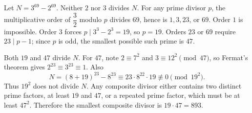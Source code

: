 Let $N=3^{69}-2^{69}$. Neither $2$ nor $3$ divides $N$. For any prime divisor $p$, the multiplicative order of $\dfrac{3}{2}$ modulo $p$ divides $69$, hence is $1,3,23$, or $69$. Order $1$ is impossible. Order $3$ forces $p\mid3^3-2^3=19$, so $p=19$. Orders $23$ or $69$ require $23\mid p-1$; since $p$ is odd, the smallest possible such prime is $47$.

Both $19$ and $47$ divide $N$. For $47$, note $2\equiv7^2$ and $3\equiv12^2\pmod{47}$, so Fermat's theorem gives $2^{23}\equiv3^{23}\equiv1$. Also
\[
N=(8+19)^{23}-8^{23}\equiv23\cdot8^{22}\cdot19\not\equiv0\pmod{19^2}.
\]
Thus $19^2$ does not divide $N$. Any composite divisor either contains two distinct prime factors, at least $19$ and $47$, or a repeated prime factor, which must be at least $47^2$. Therefore the smallest composite divisor is $\boxed{19\cdot47=893}$.
